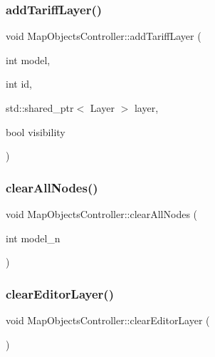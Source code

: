 \subsubsection{\texorpdfstring{addTariffLayer()}{addTariffLayer()}}
{\footnotesize\ttfamily void Map\+Objects\+Controller\+::add\+Tariff\+Layer (\begin{DoxyParamCaption}\item[{int}]{model,  }\item[{int}]{id,  }\item[{std\+::shared\+\_\+ptr$<$ Layer $>$}]{layer,  }\item[{bool}]{visibility }\end{DoxyParamCaption})\hspace{0.3cm}{\ttfamily [protected]}}

\mbox{\label{class_map_objects_controller_a00450d5120a4b2bd5f5e3c848f3a7f5c}} 
\subsubsection{\texorpdfstring{clearAllNodes()}{clearAllNodes()}}
{\footnotesize\ttfamily void Map\+Objects\+Controller\+::clear\+All\+Nodes (\begin{DoxyParamCaption}\item[{int}]{model\+\_\+n }\end{DoxyParamCaption})}

\mbox{\label{class_map_objects_controller_a63542e3a1500eddc9262bfc73136bd62}} 
\subsubsection{\texorpdfstring{clearEditorLayer()}{clearEditorLayer()}}
{\footnotesize\ttfamily void Map\+Objects\+Controller\+::clear\+Editor\+Layer (\begin{DoxyParamCaption}{ }\end{DoxyParamCaption})\hspace{0.3cm}{\ttfamily [virtual]}}



